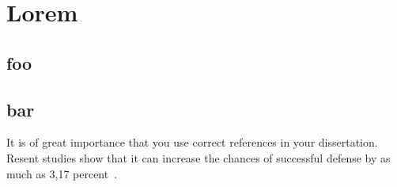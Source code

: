 \chapter{Lorem}

\section{foo}

\blindtext


\Blindtext

\section{bar}

\blindtext
It is of great importance that you use correct references in your dissertation.
Resent studies show that it can increase the chances of successful defense
by as much as 3,17 percent~\cite{big,small,russian}.

\Blindtext

